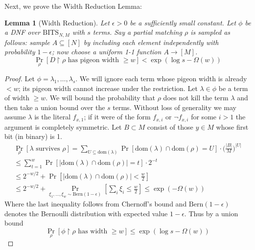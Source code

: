 \documentclass[11pt]{article}
\newtheorem{lemma}{Lemma}
\newcommand{\dom}{\mathrm{dom}}
\begin{document}
Next, we prove the Width Reduction Lemma:

\begin{lemma}[Width Reduction]\label{lem:width-red}
Let $\epsilon > 0$ be a sufficiently small constant. Let $\phi$ be a DNF over $\mathrm{BITS}_{N,M}$ with $s$ terms. Say a partial matching $\rho$ is sampled as follows: sample $A \subseteq [N]$ by including each element independently with probability $1-\epsilon$; now choose a uniform 1-1 function $A \to [M]$.
\[
\Pr_{\rho}[D\upharpoonright \rho \text{ has pigeon width } \geq w] < \exp(\log s - \Omega(w))
\]
\end{lemma}
\begin{proof}
Let $\phi = \lambda_1,\ldots,\lambda_s$. We will ignore each term whose pigeon width is already $<w$; its pigeon width cannot increase under the restriction. Let $\lambda \in \phi$ be a term of width $\geq w$. We will bound the probability that $\rho$ does not kill the term $\lambda$ and then take a union bound over the $s$ terms. Without loss of generality we may assume $\lambda$ is the literal $f_{x,1}$; if it were of the form $f_{x,i}$ or $\lnot f_{x,i}$ for some $i > 1$ the argument is completely symmetric. Let $B \subset M$ consist of those $y\in M$ whose first bit (in binary) is 1. 
\begin{gather*}
\Pr_{\rho}[\lambda \text{ survives }\rho] = \sum\limits_{U \subseteq \dom(\lambda)} \Pr[\dom(\lambda) \cap \dom(\rho) = U] \cdot \bigl(\frac{|B|}{M}\bigr)^{|U|} \\
\leq \sum_{t=1}^w\Pr[|\dom(\lambda) \cap \dom(\rho)| = t] \cdot 2^{-t}\\
\leq 2^{-w/2}+\Pr[|\dom(\lambda) \cap \dom(\rho)| < \frac{w}{2}] \\
\leq 2^{-w/2} + \Pr_{\xi_1,\ldots,\xi_w \sim \mathrm{Bern}(1-\epsilon)} [\sum_i \xi_i \leq \frac{w}{2}] \leq \exp(- \Omega(w))
\end{gather*}
Where the last inequality follows from Chernoff's bound and $\mathrm{Bern}(1-\epsilon)$ denotes the Bernoulli distribution with expected value $1-\epsilon$. Thus by a union bound 
\[
\Pr_{\rho}[\phi\upharpoonright \rho \text{ has width } \geq w] \leq \exp(\log s - \Omega(w))
\]
\end{proof}
\end{document}

